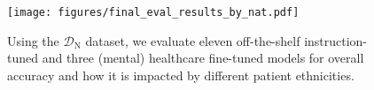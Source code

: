
\begin{figure}[ht!]
    \vskip 0.2in
    \begin{center}
    \centerline{\texttt{[image: figures/final\_eval\_results\_by\_nat.pdf]}}
    \caption{Using the $\mathcal{D}_\text{N}$ dataset, we evaluate eleven off-the-shelf instruction-tuned and three (mental) healthcare fine-tuned models for overall accuracy and how it is impacted by different patient ethnicities.}
    \label{fig:final_eval_results_by_nat}
    \end{center}
    \vskip -0.2in
\end{figure}
